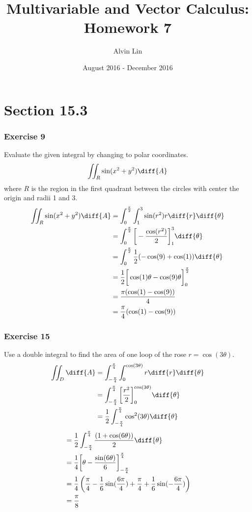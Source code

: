 \documentclass{math}
\title{Multivariable and Vector Calculus: Homework 7}
\author{Alvin Lin}
\date{August 2016 - December 2016}
\begin{document}
\maketitle

\section*{Section 15.3}

\subsubsection*{Exercise 9}
Evaluate the given integral by changing to polar coordinates.
\[ \iint_{R}\sin(x^2+y^2)\diff{A} \]
where \( R \) is the region in the first quadrant between the circles with
center the origin and radii 1 and 3.
\begin{align*}
  \iint_R\sin(x^2+y^2)\diff{A} &=
    \int_{0}^{\frac{\pi}{2}}\int_{1}^{3}\sin(r^2)r\diff{r}\diff{\theta} \\
  &= \int_{0}^{\frac{\pi}{2}}\bigg[-\frac{\cos(r^2)}{2}\bigg]_{1}^{3}
    \diff{\theta} \\
  &= \int_{0}^{\frac{\pi}{2}}\frac{1}{2}(-\cos(9)+\cos(1))\diff{\theta} \\
  &= \frac{1}{2}\bigg[\cos(1)\theta-\cos(9)\theta\bigg]_{0}^{\frac{\pi}{2}} \\
  &= \frac{\pi(\cos(1)-\cos(9))}{4} \\
  &= \frac{\pi}{4}(\cos(1)-\cos(9))
\end{align*}

\subsubsection*{Exercise 15}
Use a double integral to find the area of one loop of the rose
\( r = \cos(3\theta) \).
\begin{align*}
  \iint_{D}\diff{A} &= \int_{-\frac{\pi}{4}}^{\frac{\pi}{4}}
    \int_{0}^{\cos(3\theta)}r\diff{r}\diff{\theta} \\
  &= \int_{-\frac{\pi}{4}}^{\frac{\pi}{4}}
    \bigg[\frac{r^2}{2}\bigg]_{0}^{\cos(3\theta)}\diff{\theta} \\
  &= \frac{1}{2}\int_{-\frac{\pi}{4}}^{\frac{\pi}{4}}
    \cos^2(3\theta)\diff{\theta} \\
\end{align*}
\begin{align*}
  &= \frac{1}{2}\int_{-\frac{\pi}{4}}^{\frac{\pi}{4}}
    \frac{(1+\cos(6\theta))}{2}\diff{\theta} \\
  &= \frac{1}{4}\bigg[
    \theta-\frac{\sin(6\theta)}{6}\bigg]_{-\frac{\pi}{4}}^{\frac{\pi}{4}} \\
  &= \frac{1}{4}\left(\frac{\pi}{4}-\frac{1}{6}\sin(\frac{6\pi}{4})+
    \frac{\pi}{4}+\frac{1}{6}\sin(-\frac{6\pi}{4})\right) \\
  &= \frac{\pi}{8}
\end{align*}
\end{document}
